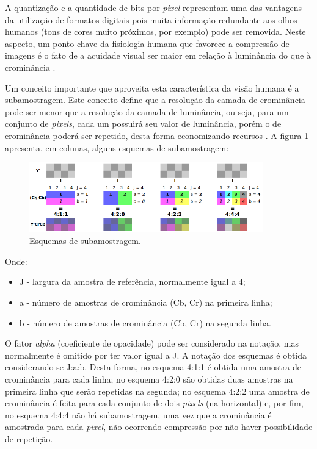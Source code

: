 A quantização e a quantidade de bits por \emph{pixel} representam uma das vantagens da utilização de formatos digitais pois muita informação redundante aos olhos humanos (tons de cores muito próximos, por exemplo) pode ser removida. Neste aspecto, um ponto chave da fisiologia humana que favorece a compressão de imagens é o fato de a acuidade visual ser maior em relação à luminância do que à crominância \cite{vandenbranden}.

Um conceito importante que aproveita esta característica da visão humana é a subamostragem. Este conceito define que a resolução da camada de crominância pode ser menor que a resolução da camada de luminância, ou seja, para um conjunto de \emph{pixels}, cada um possuirá seu valor de luminância, porém o de crominância poderá ser repetido, desta forma economizando recursos \cite{brice}. A figura \ref{fig:subsampling} apresenta, em colunas, alguns esquemas de subamostragem:

\begin{figure}[!htb]
	\centering
	\includegraphics[width=0.9\textwidth]{./imgs/subsamplingschemes.png}
	\caption{Esquemas de subamostragem.}
	\label{fig:subsampling}
\end{figure}

Onde:
\begin{itemize}
	\item J - largura da amostra de referência, normalmente igual a 4;
	\item a - número de amostras de crominância (Cb, Cr) na primeira linha;
	\item b - número de amostras de crominância (Cb, Cr) na segunda linha.
\end{itemize}

O fator \emph{alpha} (coeficiente de opacidade) pode ser considerado na notação, mas normalmente é omitido por ter valor igual a J. A notação dos esquemas é obtida considerando-se J:a:b. Desta forma, no esquema 4:1:1 é obtida uma amostra de crominância para cada linha; no esquema 4:2:0 são obtidas duas amostras na primeira linha que serão repetidas na segunda; no esquema 4:2:2 uma amostra de crominância é feita para cada conjunto de dois \emph{pixels} (na horizontal) e, por fim, no esquema 4:4:4 não há subamostragem, uma vez que a crominância é amostrada para cada \emph{pixel}, não ocorrendo compressão por não haver possibilidade de repetição.

